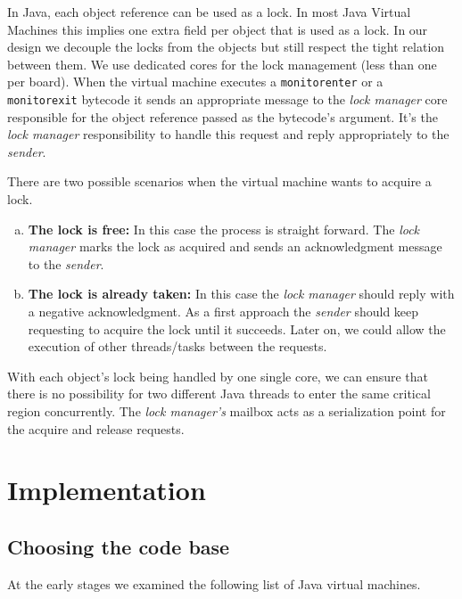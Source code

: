 \documentclass[
a4paper,
12pt,
]{report}
\newcommand{\java}{Java\texttrademark\xspace}
\begin{document}
In \java, each object reference can be used as a lock. In most \java
Virtual Machines this implies one extra field per object that is used
as a lock. In our design we decouple the locks from the objects but
still respect the tight relation between them. We use dedicated cores
for the lock management (less than one per board). When the virtual
machine executes a \verb!monitorenter! or a \verb!monitorexit!
bytecode it sends an appropriate message to the \emph{lock manager}
core responsible for the object reference passed as the bytecode's
argument. It's the \emph{lock manager} responsibility to handle this
request and reply appropriately to the \emph{sender}.

There are two possible scenarios when the virtual machine wants to
acquire a lock.
\begin{enumerate}[a)]
\item \textbf{The lock is free:} In this case the process is straight
  forward.  The \emph{lock manager} marks the lock as acquired and
  sends an acknowledgment message to the \emph{sender}.
\item \textbf{The lock is already taken:} In this case the \emph{lock
    manager} should reply with a negative acknowledgment. As a first
  approach the \emph{sender} should keep requesting to acquire the
  lock until it succeeds. Later on, we could allow the execution of
  other threads/tasks between the requests.
\end{enumerate}

With each object's lock being handled by one single core, we can
ensure that there is no possibility for two different \java threads to
enter the same critical region concurrently. The \emph{lock manager's}
mailbox acts as a serialization point for the acquire and release
requests.

\chapter{Implementation}
\label{cha:implementation}

\section{Choosing the code base}

At the early stages we examined the following list of \java virtual
machines.
\end{document}
